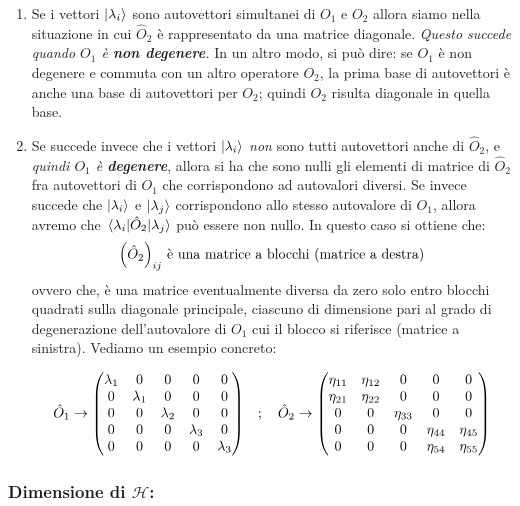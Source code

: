\begin{enumerate}[label=\arabic*)]
	\item Se i vettori $\ket{\lambda_i}$ sono autovettori simultanei di $O_1$ e $O_2$ allora siamo nella situazione in cui $\hat{O}_2$ è rappresentato da una matrice diagonale. \textit{Questo succede quando $O_1$ è \textbf{non degenere}.} In un altro modo, si può dire: se $O_1$ è non degenere e commuta con un altro operatore $O_2$, la prima base di autovettori è anche una base di autovettori per 
$O_2$; quindi $O_2$ risulta diagonale in quella base.

	\item Se succede invece che i vettori $\ket{\lambda_i}$ \textit{non} sono tutti autovettori anche di $\hat{O}_2$, e \textit{quindi $O_1$ è \textbf{degenere}}, allora si ha che sono nulli gli elementi di matrice di $\hat{O}_2$ fra autovettori di $O_1$ che corrispondono ad autovalori diversi. Se invece succede che $\ket{\lambda_i}$ e $\ket{\lambda_j}$ corrispondono allo stesso autovalore di $O_1$, allora avremo che $\mel{\lambda_i}{\hat{O}_2}{\lambda_j}$ può essere non nullo. In questo caso si ottiene che:
\begin{align*}
	\qty(\hat{O}_2)_{ij} \, \, \text{è una matrice a blocchi} \,\, \text{(matrice a destra)}
\end{align*}
	ovvero che, è una matrice eventualmente diversa da zero solo entro blocchi quadrati sulla diagonale principale, ciascuno di dimensione pari al grado di degenerazione dell'autovalore di $O_1$ cui il blocco si riferisce (matrice a sinistra). Vediamo un esempio concreto:
	
\begin{align*}
	\hat{O}_1 \to \mqty(\lambda_1 & 0 & 0 & 0 & 0 \\ 0 & \lambda_1 & 0 & 0 & 0 \\ 0 & 0 & \lambda_2 & 0 & 0 \\ 0 & 0 & 0 & \lambda_3 & 0 \\ 0 & 0 & 0 & 0 & \lambda_3 ) \quad ; \quad \hat{O}_2 \to \mqty(\eta_{11} & \eta_{12} & 0 & 0 & 0 \\ \eta_{21} & \eta_{22} & 0 & 0 & 0 \\ 0 & 0 & \eta_{33} & 0 & 0 \\ 0 & 0 & 0 & \eta_{44} & \eta_{45} \\ 0 & 0 & 0 & \eta_{54} & \eta_{55} )
\end{align*}
\end{enumerate}

\subsubsection{Dimensione di $\mathcal{H}$:}

